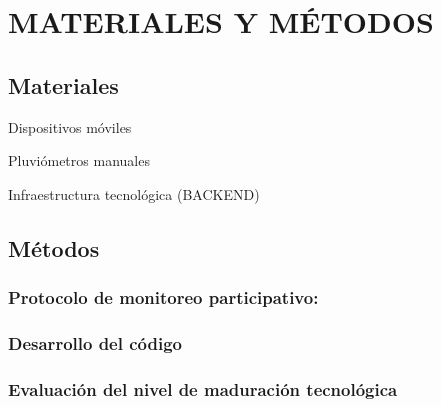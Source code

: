 \chapter{MATERIALES Y MÉTODOS}










\section{Materiales}

Dispositivos móviles

Pluviómetros manuales

Infraestructura tecnológica (BACKEND)






\section{Métodos}


\subsection{Protocolo de monitoreo participativo:}

\subsection{Desarrollo del código}
 

\subsection{Evaluación del nivel de maduración tecnológica}




 




























